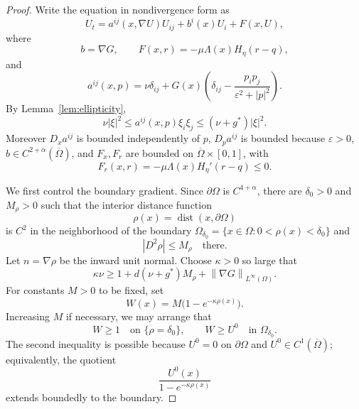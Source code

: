 \documentclass[11pt]{article}
\theoremstyle{remark}
\newcommand{\eps}{\varepsilon}
\newcommand{\nupar}{\nu}
\newcommand{\norm}[1]{\left\lVert #1\right\rVert}
\begin{document}
\begin{proof}
Write the equation in nondivergence form as
\begin{equation}\label{eq:tailored-gradient-pde}
        U_t=a^{ij}(x,\nabla U)U_{ij}+b^i(x)U_i+F(x,U),
\end{equation}
where
\[
        b=\nabla G,
        \qquad
        F(x,r)=-\mu\Lambda(x)H_\eta(r-q),
\]
and
\[
        a^{ij}(x,p)=\nupar\delta_{ij}
        +G(x)\left(\delta_{ij}-\frac{p_i p_j}{\eps^2+|p|^2}\right).
\]
By Lemma~\ref{lem:ellipticity},
\[
        \nupar|\xi|^2\le a^{ij}(x,p)\xi_i\xi_j
        \le (\nupar+g^*)|\xi|^2.
\]
Moreover $D_xa^{ij}$ is bounded independently of $p$, $D_p a^{ij}$ is bounded because $\eps>0$, $b\in C^{2+\alpha}(\overline\Omega)$, and $F_x,F_r$ are bounded on $\overline\Omega\times[0,1]$, with
\[
        F_r(x,r)=-\mu\Lambda(x)H_\eta'(r-q)\le0.
\]

We first control the boundary gradient.  Since $\partial\Omega$ is $C^{4+\alpha}$, there are $\delta_0>0$ and $M_\rho>0$ such that the interior distance function
\[
        \rho(x)=\operatorname{dist}(x,\partial\Omega)
\]
is $C^2$ in the neighborhood of the boundary $\Omega_{\delta_0}=\{x\in\Omega:0<\rho(x)<\delta_0\}$ and
\[
        |D^2\rho|\le M_\rho \quad\text{there}.
\]
Let $n=\nabla\rho$ be the inward unit normal.  Choose $\kappa>0$ so large that
\[
        \kappa\nupar
        \ge
        1+d(\nupar+g^*)M_\rho+\norm{\nabla G}_{L^\infty(\Omega)}.
\]
For constants $M>0$ to be fixed, set
\[
        W(x)=M\bigl(1-e^{-\kappa\rho(x)}\bigr).
\]
Increasing $M$ if necessary, we may arrange that
\[
        W\ge1 \quad\text{on } \{\rho=\delta_0\},
        \qquad
        W\ge U^0 \quad\text{in } \Omega_{\delta_0}.
\]
The second inequality is possible because $U^0=0$ on $\partial\Omega$ and $U^0\in C^1(\overline\Omega)$; equivalently, the quotient
\[
        \frac{U^0(x)}{1-e^{-\kappa\rho(x)}}
\]
extends boundedly to the boundary.


\end{proof}
\end{document}
